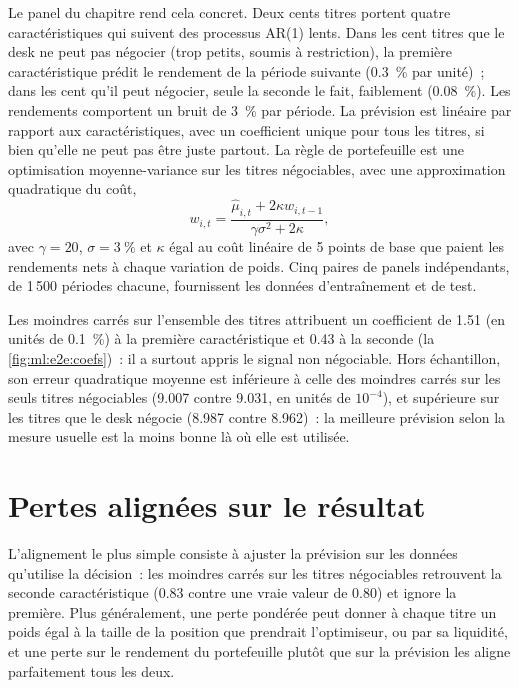 Le panel du chapitre rend cela concret. Deux cents titres portent quatre caractéristiques qui suivent des processus AR(1) lents. Dans
les cent titres que le desk ne peut pas négocier (trop petits, soumis à restriction), la première caractéristique prédit
le rendement de la période suivante (0.3~\% par unité)~; dans les cent qu'il peut négocier, seule la seconde le fait, faiblement (0.08~\%). Les rendements comportent un bruit de 3~\% par période.
La prévision est linéaire par rapport aux caractéristiques, avec un coefficient unique pour tous les titres, si bien qu'elle ne peut pas être juste partout. La
règle de portefeuille est une optimisation moyenne-variance sur les titres négociables, avec une approximation quadratique du coût,
\[
w_{i,t} = \frac{\hat\mu_{i,t} + 2\kappa w_{i,t-1}}{\gamma\sigma^2 + 2\kappa},
\]
avec $\gamma = 20$, $\sigma = 3~\%$ et $\kappa$ égal au coût linéaire de 5 points de base que paient les rendements nets à chaque
variation de poids. Cinq paires de panels indépendants, de 1\,500 périodes chacune, fournissent les données d'entraînement et de test.

Les moindres carrés sur l'ensemble des titres attribuent un coefficient de 1.51 (en unités de 0.1~\%) à la première caractéristique et 0.43 à la seconde
(la \cref{fig:ml:e2e:coefs})~: il a surtout appris le signal non négociable. Hors échantillon, son erreur quadratique moyenne est inférieure à
celle des moindres carrés sur les seuls titres négociables (9.007 contre 9.031, en unités de $10^{-4}$), et supérieure sur les titres que le
desk négocie (8.987 contre 8.962)~: la meilleure prévision selon la mesure usuelle est la moins bonne là où elle est utilisée.

\section{Pertes alignées sur le résultat}

L'alignement le plus simple consiste à ajuster la prévision sur les données qu'utilise la décision~: les moindres carrés sur les titres négociables retrouvent la
seconde caractéristique (0.83 contre une vraie valeur de 0.80) et ignore la première. Plus généralement, une perte pondérée peut donner à chaque titre un poids égal à
la taille de la position que prendrait l'optimiseur, ou par sa liquidité, et une perte sur le rendement du portefeuille plutôt que sur la
prévision les aligne parfaitement tous les deux.

